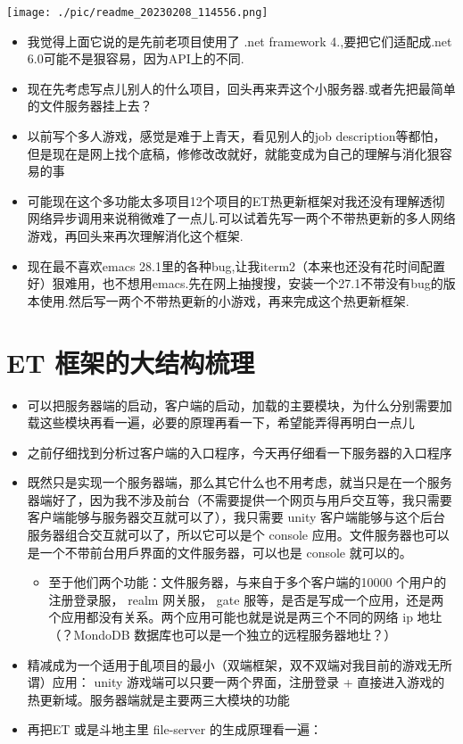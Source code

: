 \documentclass[9pt, b5paper]{article}
\begin{document}
\texttt{[image: ./pic/readme\_20230208\_114556.png]}
\begin{itemize}
\item 我觉得上面它说的是先前老项目使用了 .net framework 4.,要把它们适配成.net 6.0可能不是狠容易，因为API上的不同.
\item 现在先考虑写点儿别人的什么项目，回头再来弄这个小服务器.或者先把最简单的文件服务器挂上去？
\item 以前写个多人游戏，感觉是难于上青天，看见别人的job description等都怕，但是现在是网上找个底稿，修修改改就好，就能变成为自己的理解与消化狠容易的事
\item 可能现在这个多功能太多项目12个项目的ET热更新框架对我还没有理解透彻网络异步调用来说稍微难了一点儿.可以试着先写一两个不带热更新的多人网络游戏，再回头来再次理解消化这个框架.
\item 现在最不喜欢emacs 28.1里的各种bug,让我iterm2（本来也还没有花时间配置好）狠难用，也不想用emacs.先在网上抽搜搜，安装一个27.1不带没有bug的版本使用.然后写一两个不带热更新的小游戏，再来完成这个热更新框架.
\end{itemize}

\section{ET 框架的大结构梳理}
\label{sec-7}
\begin{itemize}
\item 可以把服务器端的启动，客户端的启动，加载的主要模块，为什么分别需要加载这些模块再看一遍，必要的原理再看一下，希望能弄得再明白一点儿
\item 之前仔细找到分析过客户端的入口程序，今天再仔细看一下服务器的入口程序
\item 既然只是实现一个服务器端，那么其它什么也不用考虑，就当只是在一个服务器端好了，因为我不涉及前台（不需要提供一个网页与用戶交互等，我只需要客户端能够与服务器交互就可以了），我只需要 unity 客户端能够与这个后台服务器组合交互就可以了，所以它可以是个 console 应用。文件服务器也可以是一个不带前台用戶界面的文件服务器，可以也是 console 就可以的。
\begin{itemize}
\item 至于他们两个功能：文件服务器，与来自于多个客户端的10000 个用户的注册登录服， realm 网关服， gate 服等，是否是写成一个应用，还是两个应用都没有关系。两个应用可能也就是说是两三个不同的网络 ip 地圵（？MondoDB 数据库也可以是一个独立的远程服务器地圵？）
\end{itemize}
\item 精减成为一个适用于臫项目的最小（双端框架，双不双端对我目前的游戏无所谓）应用： unity 游戏端可以只要一两个界面，注册登录 + 直接进入游戏的热更新域。服务器端就是主要两三大模块的功能
\item 再把ET 或是斗地主里 file-server 的生成原理看一遍：
\end{itemize}
\end{document}
